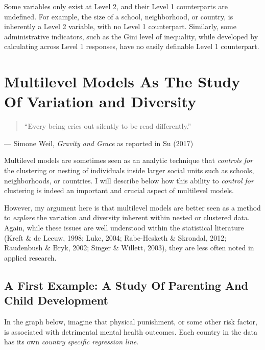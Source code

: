 \documentclass[
  letterpaper,
  DIV=11,
  numbers=noendperiod]{scrreprt}
\begin{document}
Some variables only exist at Level 2, and their Level 1 counterparts are
undefined. For example, the size of a school, neighborhood, or country,
is inherently a Level 2 variable, with no Level 1 counterpart.
Similarly, some administrative indicators, such as the Gini level of
inequality, while developed by calculating across Level 1 responses,
have no easily definable Level 1 counterpart.

\hypertarget{sec-studyvariation}{%
\section{Multilevel Models As The Study Of Variation and
Diversity}\label{sec-studyvariation}}

\begin{quote}
``Every being cries out silently to be read differently.''
\end{quote}

--- Simone Weil, \emph{Gravity and Grace} as reported in Su (2017)

Multilevel models are sometimes seen as an analytic technique that
\emph{controls for} the clustering or nesting of individuals inside
larger social units such as schools, neighborhoods, or countries. I will
describe below how this ability to \emph{control for} clustering is
indeed an important and crucial aspect of multilevel models.

However, my argument here is that multilevel models are better seen as a
method to \emph{explore} the variation and diversity inherent within
nested or clustered data. Again, while these issues are well understood
within the statistical literature (Kreft \& de Leeuw, 1998; Luke, 2004;
Rabe-Hesketh \& Skrondal, 2012; Raudenbush \& Bryk, 2002; Singer \&
Willett, 2003), they are less often noted in applied research.

\hypertarget{a-first-example-a-study-of-parenting-and-child-development}{%
\subsection{A First Example: A Study Of Parenting And Child
Development}\label{a-first-example-a-study-of-parenting-and-child-development}}

In the graph below, imagine that physical punishment, or some other risk
factor, is associated with detrimental mental health outcomes. Each
country in the data has its own \emph{country specific regression line}.
\end{document}
